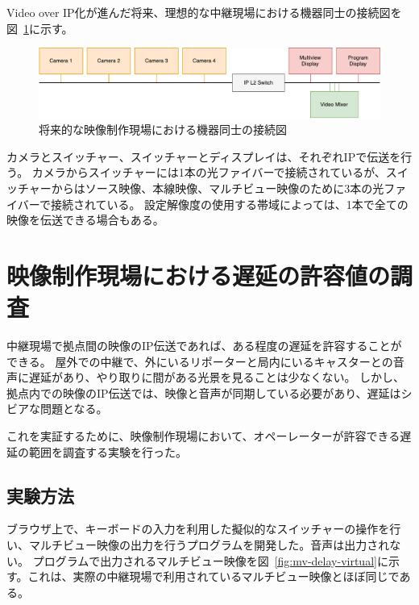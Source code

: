 Video over IP化が進んだ将来、理想的な中継現場における機器同士の接続図を図~\ref{fig:broadcast-diagram-on-ip}に示す。

\begin{figure}[htbp]
  \begin{center}
    \includegraphics[bb=0 0 787 161,width=15cm]{img/broadcast-diagram-on-ip.pdf}
  \end{center}
  \caption{将来的な映像制作現場における機器同士の接続図}
  \label{fig:broadcast-diagram-on-ip}
\end{figure}

カメラとスイッチャー、スイッチャーとディスプレイは、それぞれIPで伝送を行う。
カメラからスイッチャーには1本の光ファイバーで接続されているが、スイッチャーからはソース映像、本線映像、マルチビュー映像のために3本の光ファイバーで接続されている。
設定解像度の使用する帯域によっては、1本で全ての映像を伝送できる場合もある。

\section{映像制作現場における遅延の許容値の調査}

中継現場で拠点間の映像のIP伝送であれば、ある程度の遅延を許容することができる。
屋外での中継で、外にいるリポーターと局内にいるキャスターとの音声に遅延があり、やり取りに間がある光景を見ることは少なくない。
しかし、拠点内での映像のIP伝送では、映像と音声が同期している必要があり、遅延はシビアな問題となる。

これを実証するために、映像制作現場において、オペーレーターが許容できる遅延の範囲を調査する実験を行った。

\subsection{実験方法}

ブラウザ上で、キーボードの入力を利用した擬似的なスイッチャーの操作を行い、マルチビュー映像の出力を行うプログラムを開発した。音声は出力されない。
プログラムで出力されるマルチビュー映像を図~\ref{fig:mv-delay-virtual}に示す。これは、実際の中継現場で利用されているマルチビュー映像とほぼ同じである。

